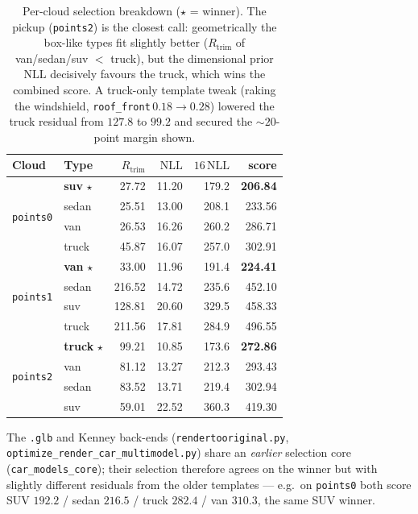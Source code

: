 \documentclass[11pt]{article}
\newcommand{\Rtrim}{R_{\text{trim}}}
\newcommand{\NLL}{\text{NLL}}
\theoremstyle{definition}
\begin{document}
\begin{table}[h]
\centering
\renewcommand{\arraystretch}{1.1}
\begin{tabular}{l l r r r r}
\toprule
\textbf{Cloud} & \textbf{Type} & $\Rtrim$ & $\NLL$ & $16\,\NLL$ & \textbf{score} \\
\midrule
\multirow{4}{*}{\texttt{points0}}
 & \textbf{suv} $\star$ & 27.72 & 11.20 & 179.2 & \textbf{206.84} \\
 & sedan                & 25.51 & 13.00 & 208.1 & 233.56 \\
 & van                  & 26.53 & 16.26 & 260.2 & 286.71 \\
 & truck                & 45.87 & 16.07 & 257.0 & 302.91 \\
\midrule
\multirow{4}{*}{\texttt{points1}}
 & \textbf{van} $\star$ & 33.00 & 11.96 & 191.4 & \textbf{224.41} \\
 & sedan                & 216.52 & 14.72 & 235.6 & 452.10 \\
 & suv                  & 128.81 & 20.60 & 329.5 & 458.33 \\
 & truck                & 211.56 & 17.81 & 284.9 & 496.55 \\
\midrule
\multirow{4}{*}{\texttt{points2}}
 & \textbf{truck} $\star$ & 99.21 & 10.85 & 173.6 & \textbf{272.86} \\
 & van                    & 81.12 & 13.27 & 212.3 & 293.43 \\
 & sedan                  & 83.52 & 13.71 & 219.4 & 302.94 \\
 & suv                    & 59.01 & 22.52 & 360.3 & 419.30 \\
\bottomrule
\end{tabular}
\caption{Per-cloud selection breakdown ($\star$ = winner). The pickup
(\texttt{points2}) is the closest call: geometrically the box-like types fit
slightly better ($\Rtrim$ of van/sedan/suv $<$ truck), but the dimensional prior
$\NLL$ decisively favours the truck, which wins the combined score. A truck-only
template tweak (raking the windshield, \texttt{roof\_front}\,$0.18\!\to\!0.28$)
lowered the truck residual from $127.8$ to $99.2$ and secured the $\sim\!20$-point
margin shown.}
\end{table}

\noindent The \texttt{.glb} and Kenney back-ends (\texttt{rendertooriginal.py},
\texttt{optimize\_render\_car\_multimodel.py}) share an \emph{earlier} selection
core (\texttt{car\_models\_core}); their selection therefore agrees on the winner
but with slightly different residuals from the older templates --- e.g.\ on
\texttt{points0} both score SUV $192.2$ / sedan $216.5$ / truck $282.4$ / van
$310.3$, the same SUV winner.
\end{document}
